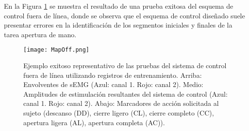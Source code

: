 En la Figura \ref{Figura: MapOff} se muestra el resultado de  una prueba exitosa del esquema de control fuera de línea, donde se observa que el esquema de control diseñado suele presentar errores en la identificación de los segmentos iniciales y finales de la tarea apertura de mano.

\begin{figure}[htbp]
	\centering
	\texttt{[image: MapOff.png]}
	\caption{Ejemplo exitoso representativo de las pruebas del sistema de control fuera de línea utilizando registros de entrenamiento. Arriba: Envolventes de sEMG (Azul: canal 1. Rojo: canal 2). Medio: Amplitudes de estimulación resultantes del sistema de control (Azul: canal 1. Rojo: canal 2). Abajo: Marcadores de acción solicitada al sujeto (descanso (DD), cierre ligero (CL), cierre completo (CC), apertura ligera (AL), apertura completa (AC)).}
	\label{Figura: MapOff}
\end{figure}



